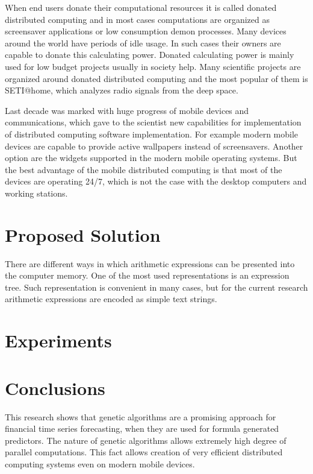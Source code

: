\documentclass[graybox]{svmult}
\begin{document}
When end users donate their computational resources it is called donated distributed computing and in most cases computations are organized as screensaver applications or low consumption demon processes. Many devices around the world have periods of idle usage. In such cases their owners are capable to donate this calculating power. Donated calculating power is mainly used for low budget projects usually in society help. Many scientific projects are organized around donated distributed computing and the most popular of them is SETI@home, which analyzes radio signals from the deep space. 

Last decade was marked with huge progress of mobile devices and communications, which gave to the scientist new capabilities for implementation of distributed computing software implementation. For example modern mobile devices are capable to provide active wallpapers instead of screensavers. Another option are the widgets supported in the modern mobile operating systems. But the best advantage of the mobile distributed computing is that most of the devices are operating 24/7, which is not the case with the desktop computers and working stations. 

\section{Proposed Solution} \label{Proposed Solution}

There are different ways in which arithmetic expressions can be presented into the computer memory. One of the most used representations is an expression tree. Such representation is convenient in many cases, but for the current research arithmetic expressions are encoded as simple text strings. 

\section{Experiments} \label{Experiments}

\section{Conclusions} \label{Conclusions}

This research shows that genetic algorithms are a promising approach for financial time series forecasting, when they are used for formula generated predictors. The nature of genetic algorithms allows extremely high degree of parallel computations. This fact allows creation of very efficient distributed computing systems even on modern mobile devices. 
\end{document}
